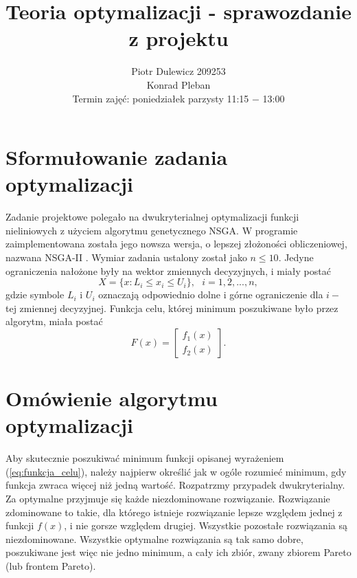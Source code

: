 \documentclass[11pt,a4paper]{article}
\title{Teoria optymalizacji - sprawozdanie z projektu}
\author{Piotr Dulewicz 209253 \\ Konrad Pleban \\ Termin zajęć: poniedziałek parzysty 11:15 \(-\) 13:00}
\date{}
\begin{document}
\maketitle
\section{Sformułowanie zadania optymalizacji}
Zadanie projektowe polegało na dwukryterialnej optymalizacji funkcji nieliniowych z użyciem algorytmu genetycznego NSGA. W programie zaimplementowana została jego nowsza wersja, o lepszej złożoności obliczeniowej, nazwana NSGA-II \cite{deb}. Wymiar zadania ustalony został jako \(n \leqslant 10\). Jedyne ograniczenia nałożone były na wektor zmiennych decyzyjnych, i miały postać
\[
X =  \lbrace x : L_i \leqslant x_i \leqslant U_i \rbrace, ~~~ i = 1,2,... ,n,  
\]
gdzie symbole \(L_i\) i \(U_i\) oznaczają odpowiednio dolne i górne ograniczenie dla \(i-\)tej zmiennej decyzyjnej. Funkcja celu, której minimum poszukiwane było przez algorytm, miała postać
\begin{equation}
F(x) = \begin{bmatrix}
  f_1(x) \\
  f_2(x) 
 \end{bmatrix}.
\label{eq:funkcja_celu}
\end{equation}

\section{Omówienie algorytmu optymalizacji}
Aby skutecznie poszukiwać minimum funkcji opisanej wyrażeniem (\ref{eq:funkcja_celu}), należy najpierw określić jak w ogóle rozumieć minimum, gdy funkcja zwraca więcej niż jedną wartość. Rozpatrzmy przypadek dwukryterialny. Za optymalne przyjmuje się każde niezdominowane rozwiązanie. 
 Rozwiązanie zdominowane to takie, dla którego istnieje rozwiązanie lepsze względem jednej z funkcji \(f(x)\), i nie gorsze względem drugiej. Wszystkie pozostałe rozwiązania są niezdominowane. 
Wszystkie optymalne rozwiązania są tak samo dobre, poszukiwane jest więc nie jedno minimum, a cały ich zbiór, zwany zbiorem Pareto (lub frontem Pareto).
\end{document}
